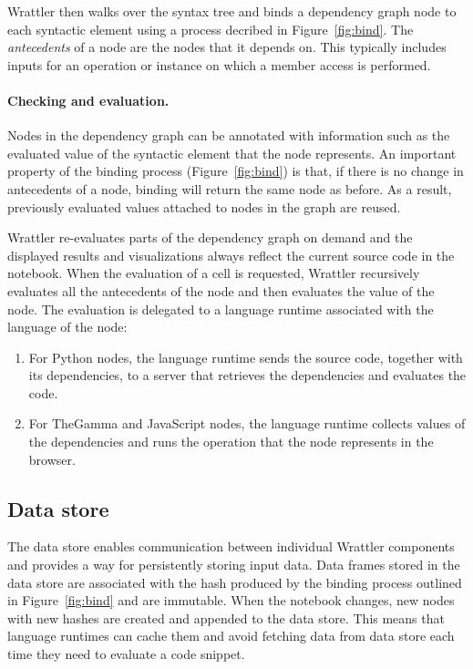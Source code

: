 \documentclass[sigplan]{acmart}\settopmatter{printfolios=true,printccs=false,printacmref=false}
\begin{document}
Wrattler then walks over the syntax tree and binds a dependency graph node
to each syntactic element using a process decribed in Figure~\ref{fig:bind}. 
The \emph{antecedents} of a node are the nodes that it depends on. This typically includes 
inputs for an operation or instance on which a member access is performed. 

\paragraph{Checking and evaluation.} 
Nodes in the dependency graph can be annotated with information such as the evaluated value
of the syntactic element that the node represents. An important property of the binding process
(Figure~\ref{fig:bind}) is that, if there is no change in antecedents of a node, binding will 
return the same node as before. As a result, previously evaluated values attached to nodes
in the graph are reused.

Wrattler re-evaluates parts of the dependency graph on demand and the displayed results and 
visualizations always reflect the current source code in the notebook. When the evaluation 
of a cell is requested, Wrattler recursively evaluates all the antecedents of the node and 
then evaluates the value of the node. The evaluation is delegated to a language
runtime associated with the language of the node:
%
\begin{enumerate}
\item For Python nodes, the language runtime sends the source code, together with its 
  dependencies, to a server that retrieves the dependencies and evaluates the code.
\item For TheGamma and JavaScript nodes, the language runtime collects values of the 
  dependencies and runs the operation that the node represents in the browser.
\end{enumerate}

\subsection{Data store}
\label{sec:comp-data}

The data store enables communication between individual Wrattler components and provides a way for 
persistently storing input data. Data frames stored in the data store are associated with the hash 
produced by the binding process outlined in Figure~\ref{fig:bind} and are immutable. When the 
notebook changes, new nodes with new hashes are created and appended to the data store. This means 
that language runtimes can cache them and avoid fetching data from data store each time they need 
to evaluate a code snippet. 
\end{document}
